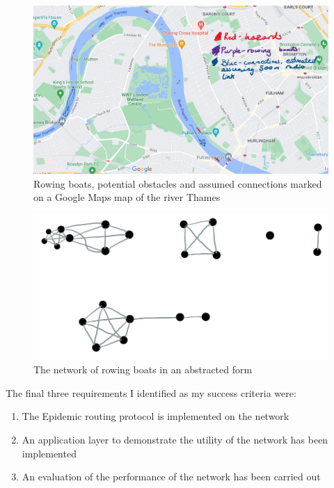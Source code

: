 \documentclass[12pt,a4paper]{report}
\begin{document}
\begin{figure}[h]
\caption{Rowing boats, potential obstacles and assumed connections marked on a Google Maps map of the river Thames}
\begin{center}
\includegraphics[scale=0.4]{mapsmarked.jpg}
\end{center}
\end{figure}
\begin{figure}[h]
\begin{center}
\caption{The network of rowing boats in an abstracted form}
\includegraphics[scale=0.5]{lines.jpg}
\end{center}
\end{figure}
\FloatBarrier The final three requirements I identified as my success criteria were:
\begin{enumerate}
\item The Epidemic routing protocol is implemented on the network 
\item An application layer to demonstrate the utility of the network has been implemented
\item An evaluation of the performance of the network has been carried out
\end{enumerate}
\end{document}
